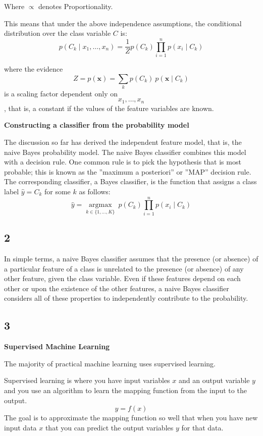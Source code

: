 \documentclass[letterpaper, 10 pt, conference]{ieeeconf}
\begin{document}
Where $\propto$ denotes Proportionality.

This means that under the above independence assumptions, the conditional distribution over the class variable $C$ is:$$p(C_k \mid x_1, \dots, x_n) = \frac{1}{Z} p(C_k) \prod_{i=1}^n p(x_i \mid C_k)$$

where the evidence $$Z = p(\mathbf{x}) = \sum_k p(C_k) \ p(\mathbf{x} \mid C_k)$$ is a scaling factor dependent only on $$x_1, \dots, x_n$$, that is, a constant if the values of the feature variables are known.

\textbf{Constructing a classifier from the probability model}

The discussion so far has derived the independent feature model, that is, the naive Bayes probability model.  The naive Bayes classifier combines this model with a decision rule.  One common rule is to pick the hypothesis that is most probable; this is known as the ''maximum a posteriori'' or ''MAP'' decision rule.  The corresponding classifier, a Bayes classifier, is the function that assigns a class label $\hat{y} = C_k$ for some $k$ as follows:$$\hat{y} = \underset{k \in \{1, \dots, K\}}{\operatorname{argmax}} \ p(C_k) \displaystyle\prod_{i=1}^n p(x_i \mid C_k)$$

\subsection*{2}

In simple terms, a naive Bayes classifier assumes that the presence (or absence) of a particular feature of a class is unrelated to the presence (or absence) of any other feature, given the class variable. Even if these features depend on each other or upon the existence of the other features, a naive Bayes classifier considers all of these properties to independently contribute to the probability.

\subsection*{3}

\textbf{Supervised Machine Learning}

The majority of practical machine learning uses supervised learning.

Supervised learning is where you have input variables $x$ and an output variable $y$ and you use an algorithm to learn the mapping function from the input to the output.
$$y = f(x)$$
The goal is to approximate the mapping function so well that when you have new input data $x$ that you can predict the output variables $y$ for that data.
\end{document}
